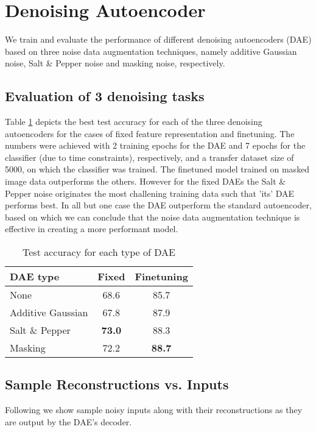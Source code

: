 \documentclass[10pt, a4paper]{article}
\title{\mytitle}
\author{\myauthor\hspace{1em}\\\contact\\University of Bern\hspace{0.5em}-\hspace{0.5em}\mymodule}
\date{}
\begin{document}
	\maketitle
    
	\section{Denoising Autoencoder}
	We train and evaluate the performance of different denoising autoencoders (DAE) based on three noise data augmentation techniques, namely additive Gaussian noise, Salt \& Pepper noise and masking noise, respectively.
	
    \subsection{Evaluation of 3 denoising tasks}
    Table \ref{table:ta} depicts the best test accuracy for each of the three denoising autoencoders for the cases of fixed feature representation and finetuning. The numbers were achieved with 2 training epochs for the DAE and 7 epochs for the classifier (due to time constraints), respectively, and a transfer dataset size of 5000, on which the classifier was trained. The finetuned model trained on masked image data outperforms the others. However for the fixed DAEs the Salt \& Pepper noise originates the most challening training data such that 'its' DAE performs best. In all but one case the DAE outperform the standard autoencoder, based on which we can conclude that the noise data augmentation technique is effective in creating a more performant model.
    
    \begin{table}[h]
    \begin{center}
    \begin{tabular}{|l|c|c|}
    \hline
    DAE type & Fixed & Finetuning \\
    \hline\hline
    None & 68.6 & 85.7 \\
    Additive Gaussian & 67.8 & 87.9 \\
    Salt \& Pepper & \textbf{73.0} & 88.3 \\
    Masking & 72.2 & \textbf{88.7} \\
    \hline
    \end{tabular}
    \end{center}
    \caption{Test accuracy for each type of DAE}
    \label{table:ta}
    \end{table}
    
    \subsection{Sample Reconstructions vs. Inputs}
    Following we show sample noisy inputs along with their reconstructions as they are output by the DAE's decoder.
    
\end{document}
